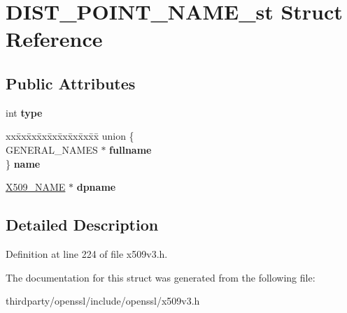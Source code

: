 \hypertarget{struct_d_i_s_t___p_o_i_n_t___n_a_m_e__st}{}\section{D\+I\+S\+T\+\_\+\+P\+O\+I\+N\+T\+\_\+\+N\+A\+M\+E\+\_\+st Struct Reference}
\label{struct_d_i_s_t___p_o_i_n_t___n_a_m_e__st}
\subsection*{Public Attributes}
\begin{DoxyCompactItemize}
\item 
\mbox{\label{struct_d_i_s_t___p_o_i_n_t___n_a_m_e__st_a86c9aa0170afe2c241c5536f45d15b46}} 
int {\bfseries type}
\item 
\mbox{\label{struct_d_i_s_t___p_o_i_n_t___n_a_m_e__st_ac5f59107e125232db4b554a29f575c5b}} 
\begin{tabbing}
xx\=xx\=xx\=xx\=xx\=xx\=xx\=xx\=xx\=\kill
union \{\\
\>GENERAL\_NAMES $\ast$ {\bfseries fullname}\\
\} {\bfseries name}\\

\end{tabbing}\item 
\mbox{\label{struct_d_i_s_t___p_o_i_n_t___n_a_m_e__st_a59bb0b428b4067a642f1fecfce319600}} 
\hyperlink{struct_x509__name__st}{X509\+\_\+\+N\+A\+ME} $\ast$ {\bfseries dpname}
\end{DoxyCompactItemize}


\subsection{Detailed Description}


Definition at line 224 of file x509v3.\+h.



The documentation for this struct was generated from the following file\+:\begin{DoxyCompactItemize}
\item 
thirdparty/openssl/include/openssl/x509v3.\+h\end{DoxyCompactItemize}
